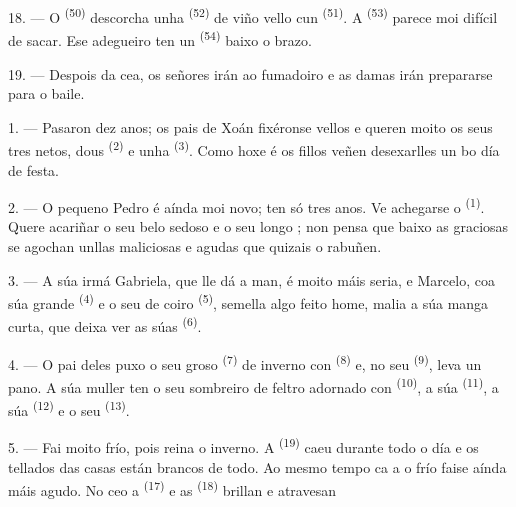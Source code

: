 18. --- O  \textsuperscript{(50)} descorcha unha 
\textsuperscript{(52)} de viño vello cun  \textsuperscript{(51)}. A
 \textsuperscript{(53)} parece moi difícil de sacar. Ese adegueiro
ten un  \textsuperscript{(54)} baixo o brazo.

19. --- Despois da cea, os señores irán ao fumadoiro e as damas irán prepararse para o baile.

\VUsaut{5.0mm}
\VUsaut{1.6mm}
\VUsaut{2.6mm}

\VUsaut{3.0mm}

1. --- Pasaron dez anos; os pais de Xoán fixéronse vellos e queren moito os seus tres netos,
dous  \textsuperscript{(2)} e unha  \textsuperscript{(3)}. Como
hoxe é  os fillos veñen desexarlles un bo día de festa.

2. --- O pequeno Pedro é aínda moi novo; ten só tres anos. Ve achegarse o
 \textsuperscript{(1)}. Quere acariñar o seu belo  sedoso e
o seu longo ; non pensa que baixo as graciosas  se agochan unllas
maliciosas e agudas que quizais o rabuñen.

3. --- A súa irmá Gabriela, que lle dá a man, é moito máis seria, e Marcelo, coa súa grande
 \textsuperscript{(4)} e o seu  de coiro \textsuperscript{(5)},
semella algo feito home, malia a súa manga curta, que deixa ver as súas 
\textsuperscript{(6)}.

4. --- O pai deles puxo o seu groso  \textsuperscript{(7)} de inverno con
 \textsuperscript{(8)} e, no seu  \textsuperscript{(9)}, leva
un pano. A súa muller ten o seu sombreiro de feltro adornado con 
\textsuperscript{(10)}, a súa  \textsuperscript{(11)}, a súa
 \textsuperscript{(12)} e o seu
 \textsuperscript{(13)}.

5. --- Fai moito frío, pois reina o inverno. A  \textsuperscript{(19)} caeu
durante todo o día e os tellados das casas están brancos de todo. Ao mesmo tempo ca a
 o frío faise aínda máis agudo. No ceo a  \textsuperscript{(17)} e
as  \textsuperscript{(18)} brillan e atravesan 

